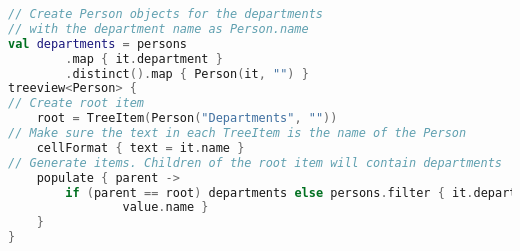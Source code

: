 \documentclass[12pt]{article}
\begin{document}
\begin{lstlisting}[language=Kotlin]
// Create Person objects for the departments
// with the department name as Person.name
val departments = persons
        .map { it.department }
        .distinct().map { Person(it, "") }
treeview<Person> {
// Create root item
    root = TreeItem(Person("Departments", ""))
// Make sure the text in each TreeItem is the name of the Person
    cellFormat { text = it.name }
// Generate items. Children of the root item will contain departments
    populate { parent ->
        if (parent == root) departments else persons.filter { it.department == parent.
                value.name }
    }
}
\end{lstlisting}
\end{document}
